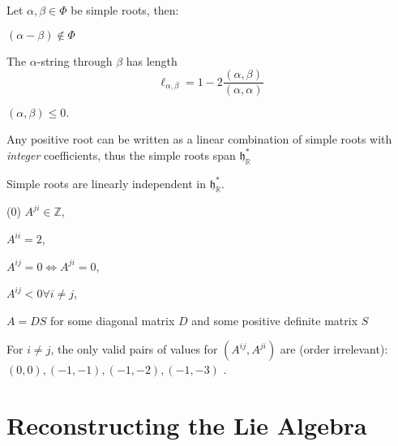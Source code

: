 \documentclass[11pt,fleqn,final]{article}
\begin{document}
\begin{prop}\label{prop:SimpleRootProps}
Let $\alpha, \beta \in \Phi$ be simple roots, then:
\begin{ronumerate}
\item $(\alpha - \beta) \notin \Phi$
\item The $\alpha$-string through $\beta$ has length
\begin{equation}
\ell_{\alpha,\beta} = 1 - 2\frac{(\alpha,\beta)}{(\alpha,\alpha)}
\end{equation}
\item $(\alpha,\beta) \leq 0.$
\item Any positive root can be written as a linear combination of simple roots with \textit{integer} coefficients, thus the simple roots span $\mathfrak{h}^*_\mathbb{R}$
\end{ronumerate}
\end{prop}

\begin{prop}
Simple roots are linearly independent in $\mathfrak{h}^*_{\mathbb{R}}$.
\end{prop}

\begin{prop}\label{prop:CartanConstraints}
\begin{ronumerate}
\item[(0)] $A^{ji} \in \mathbb{Z}$,
\item $A^{ii} = 2$,
\item $A^{ij} = 0 \Leftrightarrow A^{ji} = 0$,
\item $A^{ij} < 0 \forall i \neq j$,
\item $A = DS$ for some diagonal matrix $D$ and some positive definite matrix $S$
\end{ronumerate}
\end{prop}

\begin{prop}
For $i\neq j$, the only valid pairs of values for $(A^{ij},A^{ji})$ are (order irrelevant): $(0,0), (-1,-1), (-1,-2), (-1,-3)$ .
\end{prop}

\section{Reconstructing the Lie Algebra}
\end{document}
